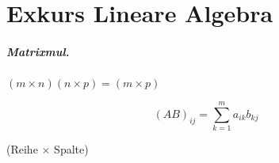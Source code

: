 \chapter{Exkurs Lineare Algebra}

\paragraph{Matrixmul.}
$(m \times n)(n \times p) = (m \times p)$

$$(AB)_{ij} = \sum_{k=1}^m a_{ik}b_{kj}$$

(Reihe $\times$ Spalte)